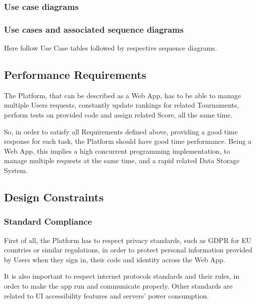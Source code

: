 \newpage

\subsubsection{Use case diagrams}

\newpage

\subsubsection{Use cases and associated sequence diagrams}
Here follow Use Case tables followed by respective sequence diagrams.


\subsection{Performance Requirements}
The Platform, that can be described as a Web App, has to be able to manage multiple Users requests, constantly update rankings for related Tournaments, perform tests on provided code and assign related Score, all the same time. 

So, in order to satisfy all Requirements defined above, providing a good time response for each task, the Platform should have good time performance. Being a Web App, this implies a high concurrent programming implementation, to 
manage multiple requests at the same time, and a rapid related Data Storage System. 

\subsection{Design Constraints}

\subsubsection{Standard Compliance}
First of all, the Platform has to respect privacy standards, such as GDPR for EU countries or similar regulations, in order to protect personal information provided by Users when they sign in, their code and identity across the Web App.

It is also important to respect internet protocols standards and their rules, in order to make the app run and communicate properly. Other standards are related to UI accessibility features and servers' power consumption. 

